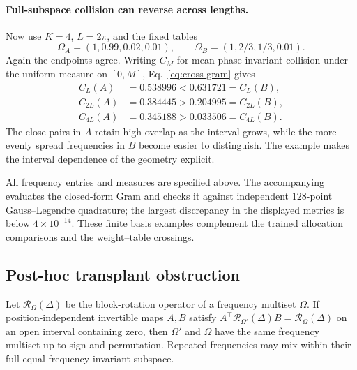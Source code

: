 \paragraph{Full-subspace collision can reverse across lengths.}
Now use $K=4$, $L=2\pi$, and the fixed tables
\[
\Omega_A=(1,0.99,0.02,0.01),\qquad
\Omega_B=(1,2/3,1/3,0.01).
\]
Again the endpoints agree. Writing $C_M$ for mean phase-invariant collision
under the uniform measure on $[0,M]$, Eq.~\eqref{eq:cross-gram} gives
\begin{align}
C_L(A)&=0.538996 < 0.631721=C_L(B),\\
C_{2L}(A)&=0.384445 > 0.204995=C_{2L}(B),\\
C_{4L}(A)&=0.345188 > 0.033506=C_{4L}(B).
\label{eq:length-order-counterexample}
\end{align}
The close pairs in $A$ retain high overlap as the interval grows, while the
more evenly spread frequencies in $B$ become easier to distinguish. The
example makes the interval dependence of the geometry explicit.

All frequency entries and measures are specified above. The accompanying
 evaluates the closed-form Gram and
checks it against independent $128$-point Gauss--Legendre quadrature;
the largest discrepancy in the displayed metrics is below $4\times10^{-14}$.
These finite basis examples complement the trained allocation comparisons and
the weight--table crossings.

\FloatBarrier
\subsection{Post-hoc transplant obstruction}
\label{sec:obstruction-proof}



\begin{theorem}
\label{thm:obstruction}
Let $\mathcal R_\Omega(\Delta)$ be the block-rotation operator of a frequency
multiset $\Omega$. If position-independent invertible maps $A,B$ satisfy
$A^\top\mathcal R_{\Omega'}(\Delta)B=\mathcal R_\Omega(\Delta)$ on an open
interval containing zero, then $\Omega'$ and $\Omega$ have the same frequency
multiset up to sign and permutation. Repeated frequencies may mix within their
full equal-frequency invariant subspace.
\end{theorem}

